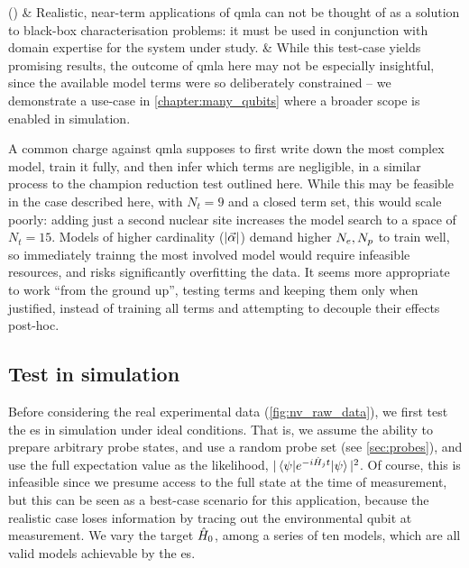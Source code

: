 \begin{easylist}[enumerate]
    \ListProperties()
    & Realistic, near-term applications of \gls{qmla} can not be thought of as a solution to black-box characterisation problems: 
        it must be used in conjunction with domain expertise for the system under study.
    & While this test-case yields promising results, the outcome of \gls{qmla} here may not be especially insightful, 
        since the available model terms were so deliberately constrained -- we demonstrate a use-case in \cref{chapter:many_qubits} 
        where a broader scope is enabled in simulation.    
\end{easylist}   
\par 

A common charge against \gls{qmla} supposes to first write down the most complex model, 
    train it fully, and then infer which terms are negligible, in a similar process to the champion reduction test outlined here. 
While this may be feasible in the case described here, with $N_t=9$ and a closed term set, 
    this would scale poorly: adding just a second nuclear site increases the model search to a space of $N_t=15$.
Models of higher cardinality ($|\vec{\alpha}|$) demand higher $N_e, N_p$ to train well, so immediately trainng the most involved model would 
    require infeasible resources\footnotemark, and risks significantly overfitting the data. 
It seems more appropriate to work ``from the ground up'', testing terms and keeping them only when justified, 
    instead of training all terms and attempting to decouple their effects post-hoc. 

\par 
\subsection{Test in simulation}
Before considering the real experimental data (\cref{fig:nv_raw_data}), 
    we first test the \gls{es} in simulation under ideal conditions. 
That is, we assume the ability to prepare arbitrary probe states, 
    and use a random probe set (see \cref{sec:probes}),
    and use the full expectation value as the likelihood, $|\braket{\psi | e^{-i \hat{H}_j t} | \psi}|^2$.
Of course, this is infeasible since we presume access to the full state at the time of measurement, 
    but this can be seen as a best-case scenario for this application, 
    because the realistic case loses information by tracing out the environmental qubit at measurement.
We vary the target $\hat{H}_0$, among a series of ten models,
    which are all valid models achievable by the \gls{es}. 


